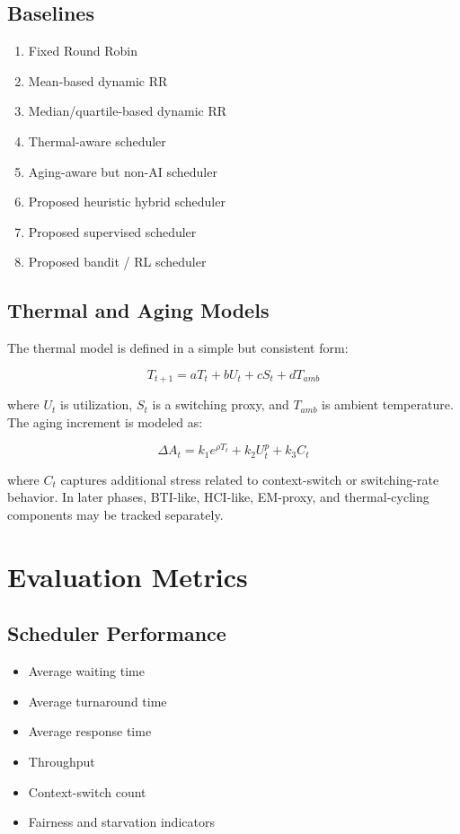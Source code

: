 \documentclass[12pt,a4paper]{article}
\begin{document}
\subsection{Baselines}

\begin{enumerate}[leftmargin=*]
\item Fixed Round Robin
\item Mean-based dynamic RR
\item Median/quartile-based dynamic RR
\item Thermal-aware scheduler
\item Aging-aware but non-AI scheduler
\item Proposed heuristic hybrid scheduler
\item Proposed supervised scheduler
\item Proposed bandit / RL scheduler
\end{enumerate}

\subsection{Thermal and Aging Models}

The thermal model is defined in a simple but consistent form:

\[
T_{t+1} = aT_t + bU_t + cS_t + dT_{amb}
\]

where $U_t$ is utilization, $S_t$ is a switching proxy, and $T_{amb}$ is ambient temperature.
The aging increment is modeled as:

\[
\Delta A_t = k_1 e^{\rho T_t} + k_2 U_t^p + k_3 C_t
\]

where $C_t$ captures additional stress related to context-switch or switching-rate behavior.
In later phases, BTI-like, HCI-like, EM-proxy, and thermal-cycling components may be tracked separately.

\section{Evaluation Metrics}

\subsection{Scheduler Performance}

\begin{itemize}[leftmargin=*]
\item Average waiting time
\item Average turnaround time
\item Average response time
\item Throughput
\item Context-switch count
\item Fairness and starvation indicators
\end{itemize}
\end{document}
